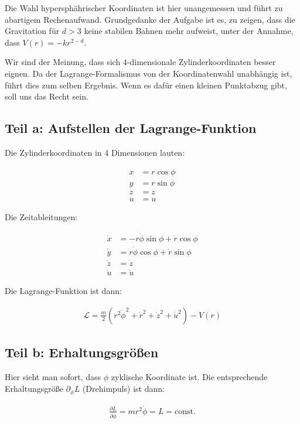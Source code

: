 \documentclass[a4paper,german,12pt,smallheadings]{scrartcl}
\begin{document}
Die Wahl hypersphährischer Koordinaten ist hier unangemessen und führt zu
abartigem Rechenaufwand. Grundgedanke der Aufgabe ist es, zu zeigen, dass die
Gravitation für $d > 3$ keine stabilen Bahnen mehr aufweist, unter der Annahme,
dass $V(r) = -kr^{2-d}$.

Wir sind der Meinung, dass sich $4$-dimensionale Zylinderkoordinaten besser
eignen. Da der Lagrange-Formalismus von der Koordinatenwahl unabhängig ist,
führt dies zum selben Ergebnis. Wenn es dafür einen kleinen Punktabzug gibt,
soll uns das Recht sein.

\subsection*{Teil a: Aufstellen der Lagrange-Funktion}

Die Zylinderkoordinaten in 4 Dimensionen lauten:

\begin{align*}
  x &= r \cos \phi \\
  y &= r \sin \phi \\
  z &= z \\
  u &= u
\end{align*}

Die Zeitableitungen:

\begin{align*}
  \dot{x} &= -r \dot{\phi} \sin \phi + \dot{r} \cos \phi\\
  \dot{y} &= r \dot{\phi} \cos \phi + \dot{r} \sin \phi\\
  \dot{z} &= \dot{z} \\
  \dot{u} &= \dot{u}
\end{align*}

Die Lagrange-Funktion ist dann:

\begin{align*}
  \mathcal{L} = \frac{m}{2}(r^2\dot{\phi}^2 + \dot{r}^2 + \dot{z}^2 + \dot{u}^2) - V(r)
\end{align*}

\subsection*{Teil b: Erhaltungsgrößen}

Hier sieht man sofort, dass $\phi$ zyklische Koordinate ist. Die entsprechende Erhaltungsgröße $\partial_{\dot{\phi}} L$ (Drehimpuls) ist dann:

\begin{align*}
  \frac{\partial L}{\partial \dot{\phi}} = mr^2 \dot{\phi} = L = \text{const.}
\end{align*}
\end{document}
